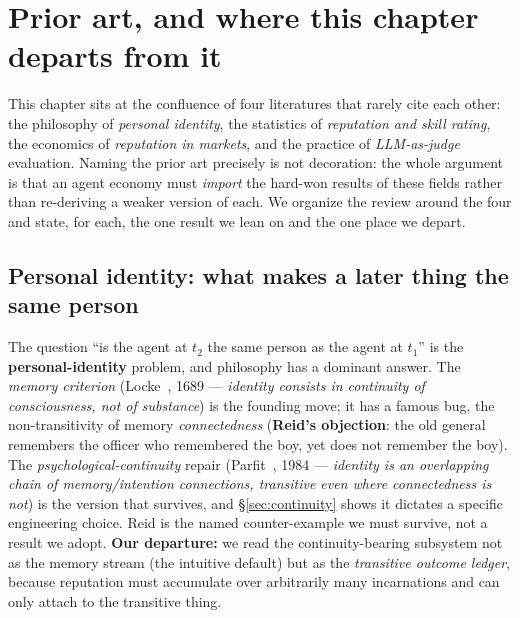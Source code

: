 \documentclass[11pt,a4paper]{article}
\theoremstyle{definition}
\begin{document}
\pdexercisepointer{\ref{ex:stp-spawn-vs-person}}{\ref{ex:stp-operator-as-person}}{\pageref{ex:stp-spawn-vs-person}}

\section{Prior art, and where this chapter departs from it}\label{sec:priorart}

This chapter sits at the confluence of four literatures that rarely cite each other:
the philosophy of \emph{personal identity}, the statistics of \emph{reputation and
skill rating}, the economics of \emph{reputation in markets}, and the practice of
\emph{LLM-as-judge} evaluation. Naming the prior art precisely is not decoration:
the whole argument is that an agent economy must \emph{import} the hard-won results
of these fields rather than re-deriving a weaker version of each. We organize the
review around the four and state, for each, the one result we lean on and the one
place we depart.

\subsection{Personal identity: what makes a later thing the same person}

The question ``is the agent at $t_2$ the same person as the agent at $t_1$'' is the
\textbf{personal-identity} problem, and philosophy has a dominant answer. The
\emph{memory criterion} (Locke~, 1689 --- \emph{identity consists
in continuity of consciousness, not of substance}) is the founding move; it has a
famous bug, the non-transitivity of memory \emph{connectedness} (\textbf{Reid's
objection}: the old general remembers the officer who remembered the boy, yet does
not remember the boy). The \emph{psychological-continuity} repair
(Parfit~, 1984 --- \emph{identity is an overlapping chain of
memory/intention connections, transitive even where connectedness is not}) is the
version that survives, and \S\ref{sec:continuity} shows it dictates a specific
engineering choice. Reid is the named counter-example we must survive, not a result
we adopt. \textbf{Our departure:} we read the continuity-bearing subsystem not as the
memory stream (the intuitive default) but as the \emph{transitive outcome ledger},
because reputation must accumulate over arbitrarily many incarnations and can only
attach to the transitive thing.
\end{document}
